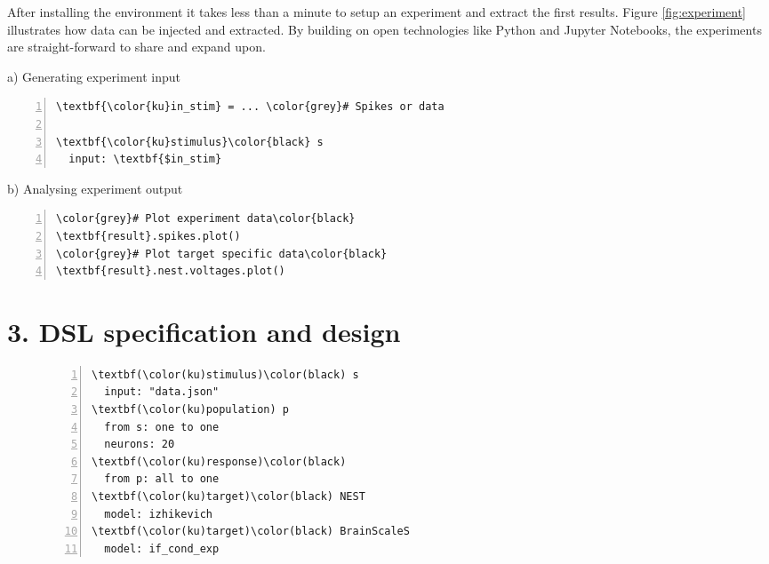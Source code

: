 \documentclass[a0,portrait]{a0poster}
\begin{document}
\begin{multicols}{2}
After installing the environment it takes less than a minute to setup an experiment and
extract the first results. 
Figure \ref{fig:experiment} illustrates how data can be injected and extracted.
By building on open technologies like Python and Jupyter Notebooks, the experiments are
straight-forward to share and expand upon.

\begin{center}
\vspace{-0.3cm}
\begin{multicols}{2}
\renewcommand{\theFancyVerbLine}{\small \arabic{FancyVerbLine}}
\centering
a) Generating experiment input
\begin{Verbatim}[numbers=left,xleftmargin=5mm,commandchars=\\\{\}]
\textbf{\color{ku}in_stim} = ... \color{grey}# Spikes or data 

\textbf{\color{ku}stimulus}\color{black} s
  input: \textbf{$in_stim}
\end{Verbatim}

b) Analysing experiment output
\begin{Verbatim}[numbers=left,xleftmargin=5mm,commandchars=\\\{\}]
\color{grey}# Plot experiment data\color{black}
\textbf{result}.spikes.plot()
\color{grey}# Plot target specific data\color{black}
\textbf{result}.nest.voltages.plot()
\end{Verbatim}
\end{multicols}
\vspace{-0.4cm}
\label{fig:experiment}
\end{center}

\section*{3. DSL specification and design}
\setlength{\columnsep}{2cm}
\begin{figure}
\vspace{-0.9cm}
\renewcommand{\theFancyVerbLine}{\small \arabic{FancyVerbLine}}
\begin{Verbatim}[numbers=left,xleftmargin=5mm,commandchars=\\\(\)]
\textbf(\color(ku)stimulus)\color(black) s
  input: "data.json"
\textbf(\color(ku)population) p
  from s: one to one
  neurons: 20
\textbf(\color(ku)response)\color(black)
  from p: all to one
\textbf(\color(ku)target)\color(black) NEST
  model: izhikevich
\textbf(\color(ku)target)\color(black) BrainScaleS
  model: if_cond_exp
\end{Verbatim}
\vspace{-0.4cm}
\label{fig:volr}
\vspace{-3cm}
\end{figure}


\end{multicols}
\end{document}
